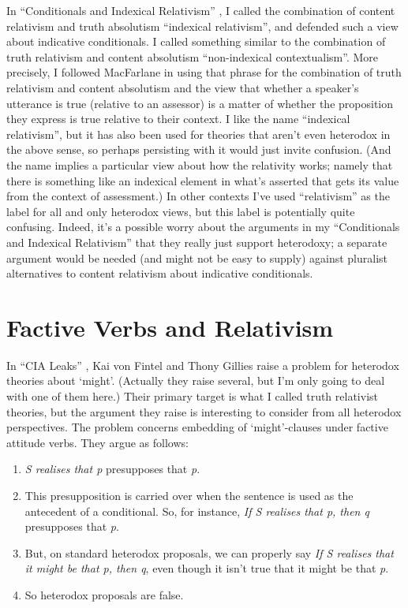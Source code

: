 In ``Conditionals and Indexical Relativism'' \citep{Weatherson2009-WEACAI}, I called the combination of content relativism and truth absolutism ``indexical relativism'', and defended such a view about indicative conditionals. I called something similar to the combination of truth relativism and content absolutism ``non-indexical contextualism''. More precisely, I followed MacFarlane in using that phrase for the combination of truth relativism and content absolutism and the view that whether a speaker's utterance is true (relative to an assessor) is a matter of whether the proposition they express is true relative to their context. I like the name ``indexical relativism'', but it has also been used for theories that aren't even heterodox in the above sense, so perhaps persisting with it would just invite confusion. (And the name implies a particular view about how the relativity works; namely that there is something like an indexical element in what's asserted that gets its value from the context of assessment.) In other contexts I've used ``relativism'' as the label for all and only heterodox views, but this label is potentially quite confusing. Indeed, it's a possible worry about the arguments in my ``Conditionals and Indexical Relativism'' that they really just support heterodoxy; a separate argument would be needed (and might not be easy to supply) against pluralist alternatives to content relativism about indicative conditionals.


\section{Factive Verbs and Relativism}

In ``CIA Leaks'' \citep{vonFintel2008}, Kai von Fintel and Thony Gillies raise a problem for heterodox theories about `might'. (Actually they raise several, but I'm only going to deal with one of them here.) Their primary target is what I called truth relativist theories, but the argument they raise is interesting to consider from all heterodox perspectives. The problem concerns embedding of `might'-clauses under factive attitude verbs. They argue as follows:

\begin{enumerate}
\item \textit{{S realises that p}}{ presupposes that }\textit{{p}}{.}
\item {This presupposition is carried over when the sentence is used as the antecedent of a conditional. So, for instance, }\textit{{If S realises that p, then q}}{ presupposes that }\textit{{p}}{.}
\item {But, on standard heterodox proposals, we can properly say }\textit{{If S realises that it might be that p, then q}}{, even though it isn't true that it might be that }\textit{{p}}{.}
\item {So heterodox proposals are false.}
\end{enumerate}

